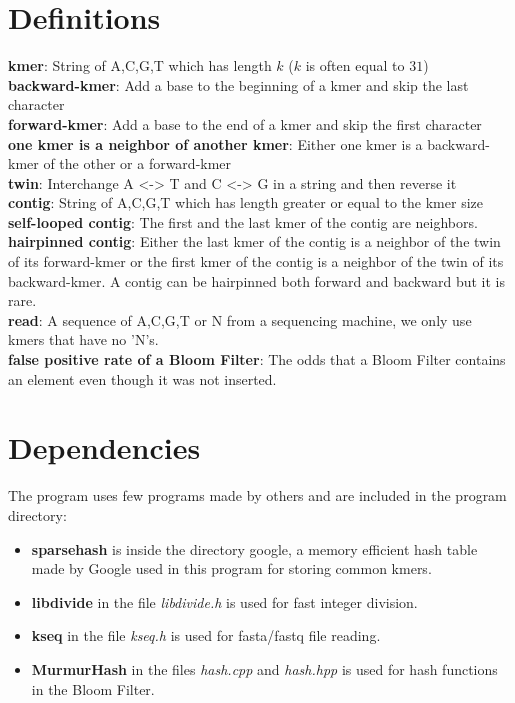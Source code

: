 \documentclass[a4paper]{report}
\renewcommand{\b}[1]{\textbf{#1}}  %
\begin{document}
\chapter{Definitions}
\b{kmer}\cite{wiki:kmer}: String of A,C,G,T which has length $k$ ($k$ is often equal to $31$) \\[2pt]
\b{backward-kmer}: Add a base to the beginning of a kmer and skip the last character\\[2pt]
\b{forward-kmer}: Add a base to the end of a kmer and skip the first character\\[2pt]
\b{one kmer is a neighbor of another kmer}: Either one kmer is a backward-kmer of the other or a forward-kmer\\[2pt]
\b{twin}: Interchange A <-> T and C <-> G in a string and then reverse it \\[2pt]
\b{contig}: String of A,C,G,T which has length greater or equal to the kmer size\\[2pt]
\b{self-looped contig}: The first and the last kmer of the contig are neighbors.\\[2pt]
\b{hairpinned contig}: Either the last kmer of the contig is a neighbor of the twin of its forward-kmer or
the first kmer of the contig is a neighbor of the twin of its backward-kmer.
A contig can be hairpinned both forward and backward but it is rare.\\[2pt]
\b{read}: A sequence of A,C,G,T or N from a sequencing machine\cite{wiki:dnaseq}, we only use kmers that
have no 'N's.\\[2pt]
\b{false positive rate of a Bloom Filter}: The odds that a Bloom Filter contains an element even though it was not inserted.
\\[8pt]

\chapter{Dependencies}
The program uses few programs made by others and are included in the program directory:

\begin{itemize}
\item \b{sparsehash}\cite{sparsehash} is inside the directory google, a memory efficient hash table made by Google
    used in this program for storing common kmers.
\item \b{libdivide}\cite{libdivide} in the file \emph{libdivide.h} is used for fast integer division.
\item \b{kseq}\cite{kseq} in the file \emph{kseq.h} is used for fasta/fastq file reading.
\item \b{MurmurHash}\cite{smhasher} in the files \emph{hash.cpp} and \emph{hash.hpp} is used for hash functions in the Bloom Filter.
\end{itemize}
\end{document}
